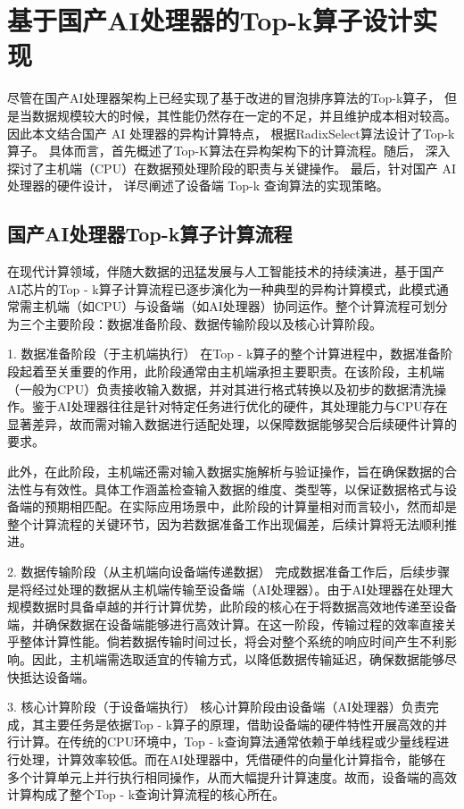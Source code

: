 \chapter{基于国产AI处理器的Top-k算子设计实现}
尽管在国产AI处理器架构上已经实现了基于改进的冒泡排序算法的Top-k算子，
但是当数据规模较大的时候，其性能仍然存在一定的不足，并且维护成本相对较高。
因此本文结合国产 AI 处理器的异构计算特点，
根据RadixSelect算法设计了Top-k算子。
具体而言，首先概述了Top-K算法在异构架构下的计算流程。随后，
深入探讨了主机端（CPU）在数据预处理阶段的职责与关键操作。
最后，针对国产 AI 处理器的硬件设计，
详尽阐述了设备端 Top-k 查询算法的实现策略。


\section{国产AI处理器Top-k算子计算流程}
在现代计算领域，伴随大数据的迅猛发展与人工智能技术的持续演进，基于国产AI芯片的Top - k算子计算流程已逐步演化为一种典型的异构计算模式，此模式通常需主机端（如CPU）与设备端（如AI处理器）协同运作。整个计算流程可划分为三个主要阶段：数据准备阶段、数据传输阶段以及核心计算阶段。

1. 数据准备阶段（于主机端执行）
在Top - k算子的整个计算进程中，数据准备阶段起着至关重要的作用，此阶段通常由主机端承担主要职责。在该阶段，主机端（一般为CPU）负责接收输入数据，并对其进行格式转换以及初步的数据清洗操作。鉴于AI处理器往往是针对特定任务进行优化的硬件，其处理能力与CPU存在显著差异，故而需对输入数据进行适配处理，以保障数据能够契合后续硬件计算的要求。

此外，在此阶段，主机端还需对输入数据实施解析与验证操作，旨在确保数据的合法性与有效性。具体工作涵盖检查输入数据的维度、类型等，以保证数据格式与设备端的预期相匹配。在实际应用场景中，此阶段的计算量相对而言较小，然而却是整个计算流程的关键环节，因为若数据准备工作出现偏差，后续计算将无法顺利推进。

2. 数据传输阶段（从主机端向设备端传递数据）
完成数据准备工作后，后续步骤是将经过处理的数据从主机端传输至设备端（AI处理器）。由于AI处理器在处理大规模数据时具备卓越的并行计算优势，此阶段的核心在于将数据高效地传递至设备端，并确保数据在设备端能够进行高效计算。在这一阶段，传输过程的效率直接关乎整体计算性能。倘若数据传输时间过长，将会对整个系统的响应时间产生不利影响。因此，主机端需选取适宜的传输方式，以降低数据传输延迟，确保数据能够尽快抵达设备端。

3. 核心计算阶段（于设备端执行）
核心计算阶段由设备端（AI处理器）负责完成，其主要任务是依据Top - k算子的原理，借助设备端的硬件特性开展高效的并行计算。在传统的CPU环境中，Top - k查询算法通常依赖于单线程或少量线程进行处理，计算效率较低。而在AI处理器中，凭借硬件的向量化计算指令，能够在多个计算单元上并行执行相同操作，从而大幅提升计算速度。故而，设备端的高效计算构成了整个Top - k查询计算流程的核心所在。

